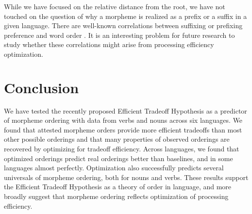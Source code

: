 \documentclass[11pt,letterpaper]{article}
\newcommand{\citep}{\parencite}
\begin{document}
While we have focused on the relative distance from the root, we have not touched on the question of why a morpheme is realized as a prefix or a suffix in a given language.
There are well-known correlations between suffixing or prefixing preference and word order \citep{greenberg1963universals}.
It is an interesting problem for future research to study whether these correlations might arise from processing efficiency optimization.




\section{Conclusion}

We have tested the recently proposed Efficient Tradeoff Hypothesis as a predictor of morpheme ordering with data from verbs and nouns across six languages.
We found that attested morpheme orders provide more efficient tradeoffs than most other possible orderings and that many properties of observed orderings are recovered by optimizing for tradeoff efficiency.
Across languages, we found that optimized orderings predict real orderings better than baselines, and in some languages almost perfectly.
Optimization also successfully predicts several universals of morpheme ordering, both for nouns and verbs.
These results support the Efficient Tradeoff Hypothesis as a theory of order in language, and more broadly suggest that morpheme ordering reflects optimization of processing efficiency.



\printbibliography
\end{document}
